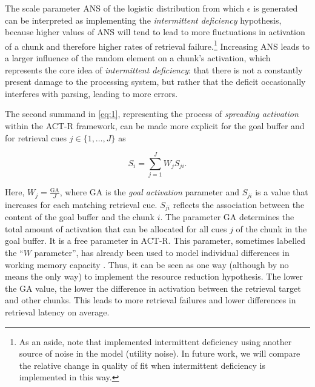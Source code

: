 \documentclass[10pt,letterpaper]{article}
\begin{document}
The scale parameter ANS of the logistic distribution from which $\epsilon$ is generated can be interpreted as implementing the \emph{intermittent deficiency} hypothesis, because higher values of ANS will tend to lead to more fluctuations in activation of a chunk and therefore higher rates of retrieval failure.\footnote{As an aside, note that  implemented intermittent deficiency using another source of noise in the model (utility noise). In future work, we will compare the relative change in quality of fit when intermittent deficiency is implemented in this way.} 
Increasing ANS leads to a larger influence of the random element on a chunk's activation, which represents the core idea of \emph{intermittent deficiency}: that there is not a constantly present damage to the processing system, but rather that the deficit occasionally interferes with parsing, leading to more errors.

The second summand in \eqref{eq:1}, representing the process of \emph{spreading activation} within the ACT-R framework, can be made more explicit for the goal buffer and for retrieval cues $j \in \{1, \ldots, J\}$ as 

\begin{equation}\label{eq:2}
  S_i = \sum_{j=1}^J W_j S_{ji}.
\end{equation}

\noindent
Here, $W_j = \frac{\text{GA}}{J}$, where GA is the \emph{goal activation} parameter and $S_{ji}$ is a value that increases for each matching retrieval cue. $S_{ji}$ reflects the association between the content of the goal buffer and the chunk $i$. 
The parameter GA determines the total amount of activation that can be allocated for all cues $j$ of the chunk in the goal buffer. It is a free parameter in ACT-R. This parameter, sometimes labelled the ``$W$ parameter'', has already been used to model individual differences in working memory capacity \cite{DailyEtAl2001}. 
Thus, it can be seen as one way (although by no means the only way) to implement the resource reduction hypothesis. 
The lower the GA value, the lower the difference in activation between the retrieval target and other chunks. This leads to more retrieval failures and lower differences in retrieval latency on average.
\end{document}
